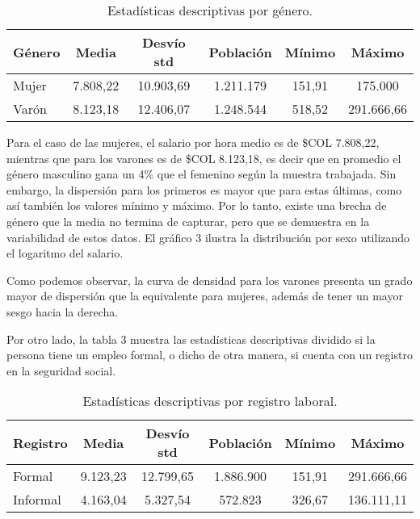 \documentclass[11pt,oneside]{article}
\begin{document}
	\begin{table}[H]
		\centering
		\begin{tabular}{lccccc}
			\hline
			\textbf{Género} & \textbf{Media} & \textbf{Desvío std} & \textbf{Población} & \textbf{Mínimo} & \textbf{Máximo} \\ \hline
			Mujer & 7.808,22 & 10.903,69 & 1.211.179 & 151,91 & 175.000 \\ 
			Varón & 8.123,18 & 12.406,07 & 1.248.544 & 518,52 & 291.666,66 \\ \hline
		\end{tabular}
		\caption{Estadísticas descriptivas por género.}
		\label{tab:estadisticas_genero}
	\end{table}
	
	
	Para el caso de las mujeres, el salario por hora medio es de \$COL 7.808,22, mientras que para los varones es de \$COL 8.123,18, es decir que en promedio el género masculino gana un 4\% que el femenino según la muestra trabajada. Sin embargo, la dispersión para los primeros es mayor que para estas últimas, como así también los valores mínimo y máximo. Por lo tanto, existe una brecha de género que la media no termina de capturar, pero que se demuestra en la variabilidad de estos datos. El gráfico 3 ilustra la distribución por sexo utilizando el logaritmo del salario. 
	
	
	Como podemos observar, la curva de densidad para los varones presenta un grado mayor de dispersión que la equivalente para mujeres, además de tener un mayor sesgo hacia la derecha.
	
	Por otro lado, la tabla 3 muestra las estadísticas descriptivas dividido si la persona tiene un empleo formal, o dicho de otra manera, si cuenta con un registro en la seguridad social.
	
	\begin{table}[H]
		\centering
		\begin{tabular}{lccccc}
			\hline
			\textbf{Registro} & \textbf{Media} & \textbf{Desvío std} & \textbf{Población} & \textbf{Mínimo} & \textbf{Máximo} \\ \hline
			Formal   & 9.123,23 & 12.799,65 & 1.886.900 & 151,91 & 291.666,66 \\ 
			Informal & 4.163,04 & 5.327,54  & 572.823   & 326,67 & 136.111,11 \\ \hline
		\end{tabular}
		\caption{Estadísticas descriptivas por registro laboral.}
		\label{tab:estadisticas_registro}
	\end{table}
	
\end{document}
